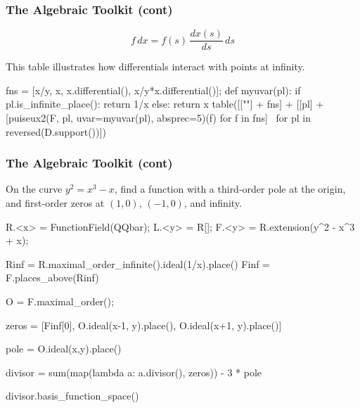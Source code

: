 \documentclass[aspectratio=169,dvipsnames]{beamer}
\begin{document}
\begin{frame}[fragile]
\frametitle{The Algebraic Toolkit (cont)}

\[ f\, dx = f(s) \, \frac{dx(s)}{ds} \, ds \]

This table illustrates how differentials interact with points at infinity.

\begin{sageblock}[ex1]
fns = [x/y, x, x.differential(), x/y*x.differential()];
def myuvar(pl):
    if pl.is_infinite_place():
        return 1/x
    else:
        return x
table([[""] + fns] + [[pl] + [puiseux2(F, pl, uvar=myuvar(pl), absprec=5)(f) for f in fns] \
                      for pl in reversed(D.support())])
\end{sageblock}

\end{frame}

\begin{frame}[fragile]
\frametitle{The Algebraic Toolkit (cont)}

On the curve $y^2 = x^3 - x$, find a function with a third-order pole at the origin, and first-order zeros at $(1,0)$, $(-1,0)$, and infinity.

\begin{sageblock}[ex1]
R.<x> = FunctionField(QQbar); L.<y> = R[]; F.<y> = R.extension(y^2 - x^3 + x);

Rinf = R.maximal_order_infinite().ideal(1/x).place()
Finf = F.places_above(Rinf)

O = F.maximal_order();

zeros = [Finf[0], O.ideal(x-1, y).place(), O.ideal(x+1, y).place()]

pole = O.ideal(x,y).place()

divisor = sum(map(lambda a: a.divisor(), zeros)) - 3 * pole

divisor.basis_function_space()

\end{sageblock}

\end{frame}

\end{document}
